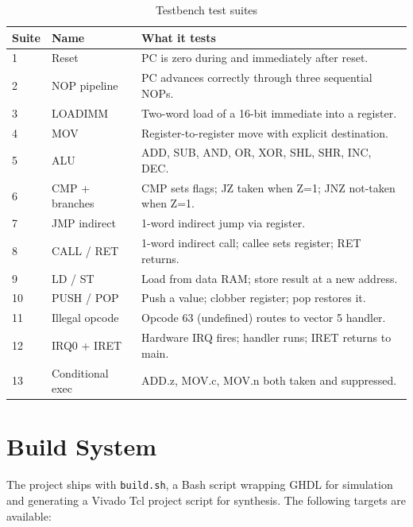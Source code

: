 \documentclass[a4paper,12pt]{report}
\begin{document}
\begin{table}[htbp]
\centering
\caption{Testbench test suites}
\begin{tabularx}{\textwidth}{llX}
    \toprule
    \textbf{Suite} & \textbf{Name} & \textbf{What it tests} \\
    \midrule
    1  & Reset              & PC is zero during and immediately after reset. \\
    2  & NOP pipeline       & PC advances correctly through three sequential NOPs. \\
    3  & LOADIMM            & Two-word load of a 16-bit immediate into a register. \\
    4  & MOV                & Register-to-register move with explicit destination. \\
    5  & ALU                & ADD, SUB, AND, OR, XOR, SHL, SHR, INC, DEC. \\
    6  & CMP + branches     & CMP sets flags; JZ taken when Z=1; JNZ not-taken when Z=1. \\
    7  & JMP indirect       & 1-word indirect jump via register. \\
    8  & CALL / RET         & 1-word indirect call; callee sets register; RET returns. \\
    9  & LD / ST            & Load from data RAM; store result at a new address. \\
    10 & PUSH / POP         & Push a value; clobber register; pop restores it. \\
    11 & Illegal opcode     & Opcode 63 (undefined) routes to vector 5 handler. \\
    12 & IRQ0 + IRET        & Hardware IRQ fires; handler runs; IRET returns to main. \\
    13 & Conditional exec   & ADD.z, MOV.c, MOV.n both taken and suppressed. \\
    \bottomrule
\end{tabularx}
\end{table}

\section{Build System}

The project ships with \texttt{build.sh}, a Bash script wrapping GHDL for simulation and generating a Vivado Tcl project script for synthesis. The following targets are available:
\end{document}
